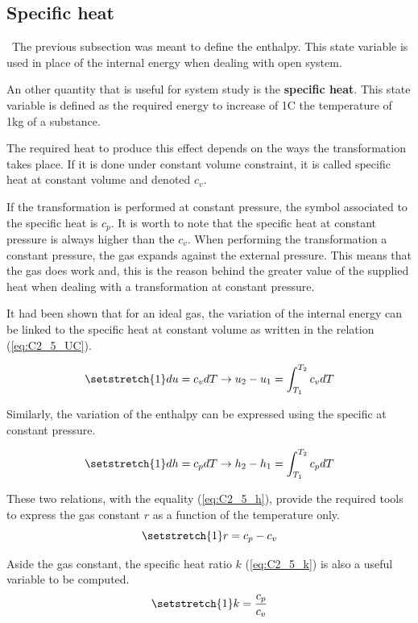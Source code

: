 \subsection{Specific heat}
\quad\ The previous subsection was meant to define the enthalpy. This state variable is used in place of the internal energy when dealing with open system.

An other quantity that is useful for system study is the \textbf{specific heat}. This state variable is defined as the required energy to increase of 1\degree C the temperature of 1kg of a substance. 
 
The required heat to produce this effect depends on the ways the transformation takes place. 
If it is done under constant volume constraint, it is called specific heat at constant volume and denoted $c_v$. 

If the transformation is performed at constant pressure, the symbol associated to the specific heat is $c_p$.
It is worth to note that the specific heat at constant pressure is always higher than the $c_v$. When performing the transformation a constant pressure, the gas expands against the external pressure. This means that the gas does work and, this is the reason behind the greater value of the supplied heat when dealing with a transformation at constant pressure. 

It had been shown that for an ideal gas, the variation of the internal energy can be linked to the specific heat at constant volume as written in the relation (\ref{eq:C2_5_UC}).

\begin{equation}
\setstretch{1}
du = c_vdT \rightarrow u_2 - u_1 = \int_{T_1}^{T_2} c_vdT\label{eq:C2_5_UC}
\end{equation} 

Similarly, the variation of the enthalpy can be expressed using the specific at constant pressure.

\begin{equation}
\setstretch{1}
dh = c_pdT \rightarrow h_2 - h_1 = \int_{T_1}^{T_2} c_pdT\label{eq:C2_5_UP}
\end{equation} 

These two relations, with the equality (\ref{eq:C2_5_h}), provide the required tools to express the gas constant $r$ as a function of the temperature only. 
\begin{equation}
\setstretch{1}
r = c_p - c_v \label{eq:C2_5_r}
\end{equation}

Aside the gas constant, the specific heat ratio $k$ (\ref{eq:C2_5_k}) is also a useful variable to be computed.
\begin{equation}
\setstretch{1}
k = \frac{c_p}{c_v} \label{eq:C2_5_k}
\end{equation}
